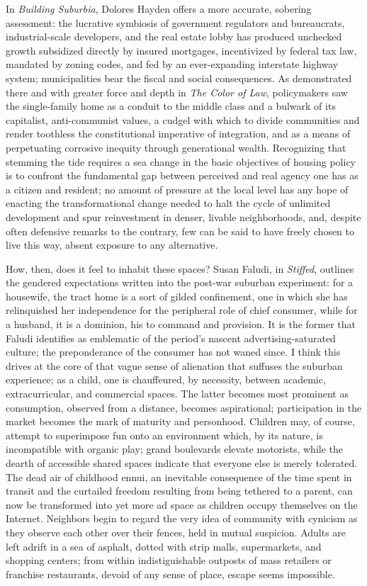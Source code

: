 \documentclass[oneside, a5paper]{book}
\begin{document}
In \textit{Building Suburbia}, Dolores Hayden offers a more accurate, sobering assessment: the lucrative symbiosis of government regulators and bureaucrats, industrial-scale developers, and the real estate lobby has produced unchecked growth subsidized directly by insured mortgages, incentivized by federal tax law, mandated by zoning codes, and fed by an ever-expanding interstate highway system; municipalities bear the fiscal and social consequences. As demonstrated there and with greater force and depth in \textit{The Color of Law}, policymakers saw the single-family home as a conduit to the middle class and a bulwark of its capitalist, anti-communist values, a cudgel with which to divide communities and render toothless the constitutional imperative of integration, and as a means of perpetuating corrosive inequity through generational wealth. Recognizing that stemming the tide requires a sea change in the basic objectives of housing policy is to confront the fundamental gap between perceived and real agency one has as a citizen and resident; no amount of pressure at the local level has any hope of enacting the transformational change needed to halt the cycle of unlimited development and spur reinvestment in denser, livable neighborhoods, and, despite often defensive remarks to the contrary, few can be said to have freely chosen to live this way, absent exposure to any alternative.

How, then, does it feel to inhabit these spaces? Susan Faludi, in \textit{Stiffed}, outlines the gendered expectations written into the post-war suburban experiment: for a housewife, the tract home is a sort of gilded confinement, one in which she has relinquished her independence for the peripheral role of chief consumer, while for a husband, it is a dominion, his to command and provision. It is the former that Faludi identifies as emblematic of the period's nascent advertising-saturated culture; the preponderance of the consumer has not waned since. I think this drives at the core of that vague sense of alienation that suffuses the suburban experience; as a child, one is chauffeured, by necessity, between academic, extracurricular, and commercial spaces. The latter becomes most prominent as consumption, observed from a distance, becomes aspirational; participation in the market becomes the mark of maturity and personhood. Children may, of course, attempt to superimpose fun onto an environment which, by its nature, is incompatible with organic play; grand boulevards elevate motorists, while the dearth of accessible shared spaces indicate that everyone else is merely tolerated. The dead air of childhood ennui, an inevitable consequence of the time spent in transit and the curtailed freedom resulting from being tethered to a parent, can now be transformed into yet more ad space as children occupy themselves on the Internet. Neighbors begin to regard the very idea of community with cynicism as they observe each other over their fences, held in mutual suspicion. Adults are left adrift in a sea of asphalt, dotted with strip malls, supermarkets, and shopping centers; from within indistiguishable outposts of mass retailers or franchise restaurants, devoid of any sense of place, escape seems impossible.
\end{document}
